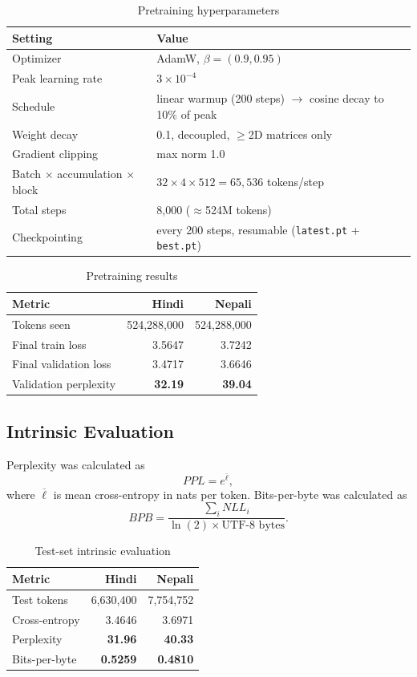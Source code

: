 \documentclass[10pt,a4paper]{article}
\begin{document}
\begin{table}[H]\centering
\caption{Pretraining hyperparameters}
\small
\begin{tabular}{ll}\toprule
Setting & Value\\\midrule
Optimizer & AdamW, $\beta=(0.9,0.95)$\\
Peak learning rate & $3\times10^{-4}$\\
Schedule & linear warmup (200 steps) $\to$ cosine decay to 10\% of peak\\
Weight decay & 0.1, decoupled, $\geq$2D matrices only\\
Gradient clipping & max norm 1.0\\
Batch $\times$ accumulation $\times$ block & $32\times4\times512=65{,}536$ tokens/step\\
Total steps & 8,000 ($\approx$524M tokens)\\
Checkpointing & every 200 steps, resumable (\texttt{latest.pt} + \texttt{best.pt})\\
\bottomrule\end{tabular}
\end{table}

\begin{table}[H]\centering
\caption{Pretraining results}
\small
\begin{tabular}{lrr}\toprule
Metric & Hindi & Nepali\\\midrule
Tokens seen & 524,288,000 & 524,288,000\\
Final train loss & 3.5647 & 3.7242\\
Final validation loss & 3.4717 & 3.6646\\
Validation perplexity & \textbf{32.19} & \textbf{39.04}\\
\bottomrule\end{tabular}
\end{table}


\subsection{Intrinsic Evaluation}
Perplexity was calculated as
\[
PPL=e^{\overline{\ell}},
\]
where $\overline{\ell}$ is mean cross-entropy in nats per token.
Bits-per-byte was calculated as
\[
BPB=\frac{\sum_i NLL_i}
{\ln(2)\times\text{UTF-8 bytes}}.
\]

\begin{table}[H]\centering
\caption{Test-set intrinsic evaluation}
\small
\begin{tabular}{lrr}\toprule
Metric & Hindi & Nepali\\\midrule
Test tokens & 6,630,400 & 7,754,752\\
Cross-entropy & 3.4646 & 3.6971\\
Perplexity & \textbf{31.96} & \textbf{40.33}\\
Bits-per-byte & \textbf{0.5259} & \textbf{0.4810}\\
\bottomrule\end{tabular}
\end{table}
\end{document}

